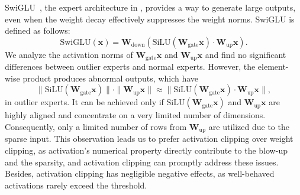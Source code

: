 SwiGLU~\cite{shazeer2020gluvariantsimprovetransformer}, the expert architecture in \ourmodel, provides a way to generate large outputs, even when the weight decay effectively suppresses the weight norms. SwiGLU is defined as follows:
\begin{equation}
\text{SwiGLU}(\boldsymbol{x}) = \boldsymbol{W}_{\text{down}}\left(\text{SiLU}(\boldsymbol{W}_{\text{gate}}\boldsymbol{x})\cdot\boldsymbol{W}_{\text{up}}\boldsymbol{x}\right).
\end{equation}
We analyze the activation norms of $\boldsymbol{W}_{\text{gate}}\boldsymbol{x}$ and $\boldsymbol{W}_{\text{up}}\boldsymbol{x}$ and find no significant differences between outlier experts and normal experts. However, the element-wise product produces abnormal outputs, which have
\begin{equation}
\|\text{SiLU}(\boldsymbol{W}_{\text{gate}}\boldsymbol{x})\|\cdot\|\boldsymbol{W}_{\text{up}}\boldsymbol{x}\|\approx\|\text{SiLU}(\boldsymbol{W}_{\text{gate}}\boldsymbol{x})\cdot\boldsymbol{W}_{\text{up}}\boldsymbol{x}\|,
\end{equation}
in outlier experts. It can be achieved only if $\text{SiLU}(\boldsymbol{W}_{\text{gate}}\boldsymbol{x})$ and $\boldsymbol{W}_{\text{up}}\boldsymbol{x}$ are highly aligned and concentrate on a very limited number of dimensions. Consequently, only a limited number of rows from \(\boldsymbol{W}_{\text{up}}\) are utilized due to the sparse input. This observation leads us to prefer activation clipping over weight clipping, as activation's numerical property directly contribute to the blow-up and the sparsity, and activation clipping can promptly address these issues. Besides, activation clipping has negligible negative effects, as well-behaved activations rarely exceed the threshold.

